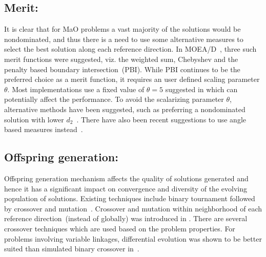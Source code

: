 \subsection{Merit:} It is clear that for MaO problems a vast majority of the solutions would be nondominated, and thus there is a need to use some alternative measures to select the best solution along each reference direction. In MOEA/D~\cite{zhang2007moead}, three such merit functions were suggested, viz. the weighted sum, Chebyshev and the penalty based boundary intersection~(PBI). While PBI continues to be the preferred choice as a merit function, it requires an user defined scaling parameter $\theta$. Most implementations use a fixed value of $\theta=5$ suggested in \cite{zhang2007moead} which can potentially affect the performance. To avoid the scalarizing parameter $\theta$, alternative methods have been suggested, such as preferring a nondominated solution with lower $d_2$~\cite{Asafmany2015}. There have also been recent suggestions to use angle based measures instead~\cite{Cheng2016many}.

\subsection{Offspring generation:} Offspring generation mechanism affects the quality of solutions generated and hence it has a significant impact on convergence and diversity of the evolving population of solutions. Existing techniques include binary tournament followed by crossover and mutation~\cite{Asafmany2015}. Crossover and mutation within neighborhood of each reference direction~(instead of globally) was introduced in \cite{zhang2007moead}. There are several crossover techniques which are used based on the problem properties. For problems involving variable linkages, differential evolution was shown to be better suited than simulated binary crossover in~\cite{li2009multiobjective}.

